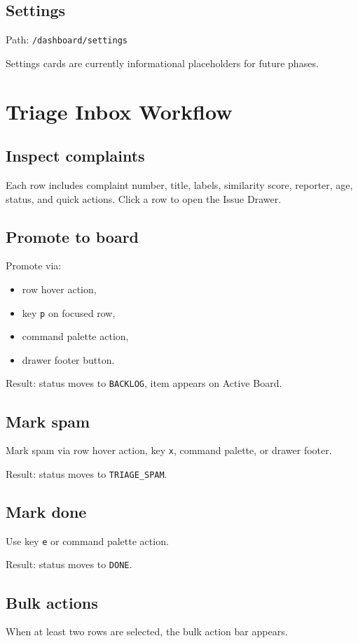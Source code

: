 \documentclass[11pt,a4paper]{article}
\begin{document}
\subsection{Settings}
Path: \texttt{/dashboard/settings}

Settings cards are currently informational placeholders for future phases.

\section{Triage Inbox Workflow}
\subsection{Inspect complaints}
Each row includes complaint number, title, labels, similarity score, reporter, age, status, and quick actions.
Click a row to open the Issue Drawer.

\subsection{Promote to board}
Promote via:
\begin{itemize}
  \item row hover action,
  \item key \texttt{p} on focused row,
  \item command palette action,
  \item drawer footer button.
\end{itemize}

Result: status moves to \texttt{BACKLOG}, item appears on Active Board.

\subsection{Mark spam}
Mark spam via row hover action, key \texttt{x}, command palette, or drawer footer.

Result: status moves to \texttt{TRIAGE\_SPAM}.

\subsection{Mark done}
Use key \texttt{e} or command palette action.

Result: status moves to \texttt{DONE}.

\subsection{Bulk actions}
When at least two rows are selected, the bulk action bar appears.
\end{document}
